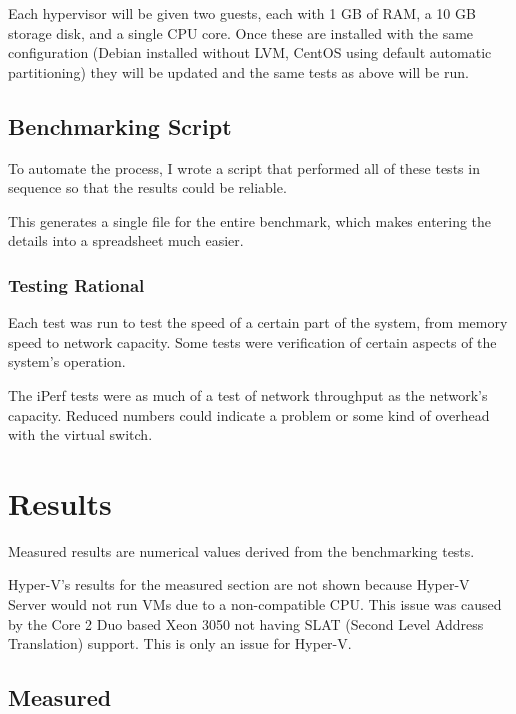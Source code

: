 \documentclass[12pt]{spieman}  %
\begin{document}
Each hypervisor will be given two guests, each with 1 GB of RAM, a 10 GB storage disk, and a single CPU core. Once these are installed with the same configuration (Debian installed without LVM, CentOS using default automatic partitioning) they will be updated and the same tests as above will be run.

\subsection{Benchmarking Script}
\label{subsec:script}

To automate the process, I wrote a script that performed all of these tests in sequence so that the results could be reliable.



This generates a single file for the entire benchmark, which makes entering the details into a spreadsheet much easier.

\subsubsection{Testing Rational}
\label{subsec:rational}

Each test was run to test the speed of a certain part of the system, from memory speed to network capacity. Some tests were verification of certain aspects of the system's operation.

The iPerf tests were as much of a test of network throughput as the network's capacity. Reduced numbers could indicate a problem or some kind of overhead with the virtual switch.

\section{Results}

Measured results are numerical values derived from the benchmarking tests. 

Hyper-V's results for the measured section are not shown because Hyper-V Server would not run VMs due to a non-compatible CPU. This issue was caused by the Core 2 Duo based Xeon 3050 not having SLAT (Second Level Address Translation) support. This is only an issue for Hyper-V.

\subsection{Measured}
\end{document}
